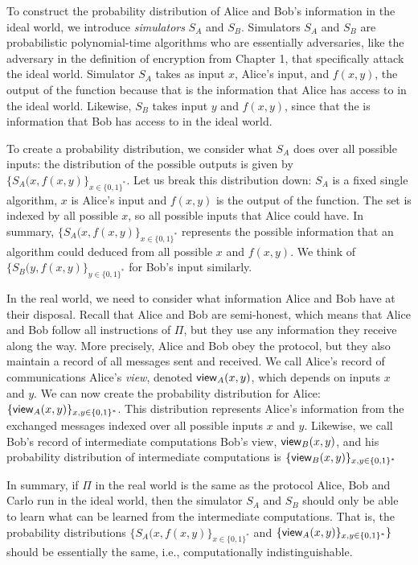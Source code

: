 To construct the probability distribution of Alice and Bob's information in the ideal world, we introduce \textit{simulators} $S_A$ and $S_B$.
Simulators $S_A$ and $S_B$ are probabilistic polynomial-time algorithms who are essentially adversaries, like the adversary in the definition of encryption from Chapter 1, that specifically attack the ideal world.
Simulator $S_A$ takes as input $x$, Alice's input, and $f(x,y)$, the output of the function because that is the information that Alice has access to in the ideal world.
Likewise, $S_B$ takes input $y$ and $f(x,y)$, since that the is information that Bob has access to in the ideal world.

To create a probability distribution, we consider what $S_A$ does over all possible inputs: the distribution of the possible outputs is given by $\{S_A(x, f(x,y)\}_{x \in \{0,1\}^*}$.
Let us break this distribution down: $S_A$ is a fixed single algorithm, $x$ is Alice's input and $f(x,y)$ is the output of the function.
The set is indexed by all possible $x$, so all possible inputs that Alice could have.
In summary, $\{S_A(x, f(x,y)\}_{x \in \{0,1\}^*}$ represents the possible information that an algorithm could deduced from all possible $x$ and $f(x,y)$.
We think of $\{S_B(y, f(x,y)\}_{y \in \{0,1\}^*}$ for Bob's input similarly.

In the real world, we need to consider what information Alice and Bob have at their disposal.
Recall that Alice and Bob are semi-honest, which means that Alice and Bob follow all instructions of $\Pi$, but they use any information they receive along the way.
More precisely, Alice and Bob obey the protocol, but they also maintain a record of all messages sent and received.
We call Alice's record of communications Alice's \textit{view}, denoted ${\sf view}_A(x, y)$, which depends on inputs $x$ and $y$.
We can now create the probability distribution for Alice: $\{{\sf view}_A(x, y)\}_{x, y \in \{0,1\}^*}$.
This distribution represents Alice's information from the exchanged messages indexed over all possible inputs $x$ and $y$.
Likewise, we call Bob's record of intermediate computations Bob's view, ${\sf view}_B(x, y)$, and his probability distribution of intermediate computations is $\{{\sf view}_B(x, y)\}_{x,y \in \{0,1\}^*}$

In summary, if $\Pi$ in the real world is the same as the protocol Alice, Bob and Carlo run in the ideal world, then the simulator $S_A$ and $S_B$ should only be able to learn what can be learned from the intermediate computations. 
That is, the probability distributions $\{S_A(x, f(x,y)\}_{x \in \{0,1\}^*}$ and $\{{\sf view}_A(x, y)\}_{x, y \in \{0,1\}^*}\}$ should be essentially the same, i.e., computationally indistinguishable.

